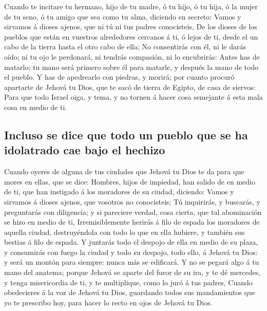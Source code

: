  Cuando te incitare tu hermano, hijo de tu madre, ó tu
hijo, ó tu hija, ó la mujer de tu seno, ó tu amigo que sea como tu alma,
diciendo en secreto: Vamos y sirvamos á dioses ajenos, que ni tú ni tus
padres conocisteis,  De los dioses de los pueblos que
están en vuestros alrededores cercanos á ti, ó lejos de ti, desde el un
cabo de la tierra hasta el otro cabo de ella;  No
consentirás con él, ni le darás oído; ni tu ojo le perdonará, ni tendrás
compasión, ni lo encubrirás:  Antes has de matarlo; tu
mano será primero sobre él para matarle, y después la mano de todo el
pueblo.  Y has de apedrearlo con piedras, y morirá; por
cuanto procuró apartarte de Jehová tu Dios, que te sacó de tierra de
Egipto, de casa de siervos:  Para que todo Israel oiga, y
tema, y no tornen á hacer cosa semejante á esta mala cosa en medio de
ti.

\hypertarget{incluso-se-dice-que-todo-un-pueblo-que-se-ha-idolatrado-cae-bajo-el-hechizo}{%
\subsection{Incluso se dice que todo un pueblo que se ha idolatrado cae
bajo el
hechizo}\label{incluso-se-dice-que-todo-un-pueblo-que-se-ha-idolatrado-cae-bajo-el-hechizo}}

 Cuando oyeres de alguna de tus ciudades que Jehová tu
Dios te da para que mores en ellas, que se dice: 
Hombres, hijos de impiedad, han salido de en medio de ti, que han
instigado á los moradores de su ciudad, diciendo: Vamos y sirvamos á
dioses ajenos, que vosotros no conocisteis;  Tú
inquirirás, y buscarás, y preguntarás con diligencia; y si pareciere
verdad, cosa cierta, que tal abominación se hizo en medio de ti,
 Irremisiblemente herirás á filo de espada los moradores
de aquella ciudad, destruyéndola con todo lo que en ella hubiere, y
también sus bestias á filo de espada.  Y juntarás todo el
despojo de ella en medio de su plaza, y consumirás con fuego la ciudad y
todo su despojo, todo ello, á Jehová tu Dios: y será un montón para
siempre: nunca más se edificará.  Y no se pegará algo á
tu mano del anatema; porque Jehová se aparte del furor de su ira, y te
dé mercedes, y tenga misericordia de ti, y te multiplique, como lo juró
á tus padres,  Cuando obedecieres á la voz de Jehová tu
Dios, guardando todos sus mandamientos que yo te prescribo hoy, para
hacer lo recto en ojos de Jehová tu Dios.

